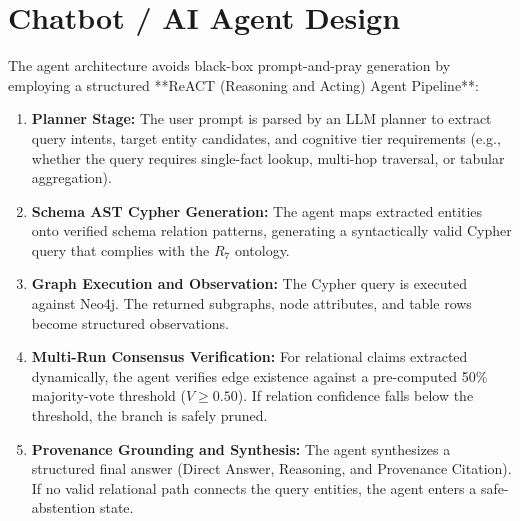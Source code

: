\section{Chatbot / AI Agent Design}
The agent architecture avoids black-box prompt-and-pray generation by employing a structured **ReACT (Reasoning and Acting) Agent Pipeline**:
\begin{enumerate}
    \item \textbf{Planner Stage:} The user prompt is parsed by an LLM planner to extract query intents, target entity candidates, and cognitive tier requirements (e.g., whether the query requires single-fact lookup, multi-hop traversal, or tabular aggregation).
    \item \textbf{Schema AST Cypher Generation:} The agent maps extracted entities onto verified schema relation patterns, generating a syntactically valid Cypher query that complies with the $R_7$ ontology.
    \item \textbf{Graph Execution and Observation:} The Cypher query is executed against Neo4j. The returned subgraphs, node attributes, and table rows become structured observations.
    \item \textbf{Multi-Run Consensus Verification:} For relational claims extracted dynamically, the agent verifies edge existence against a pre-computed 50\% majority-vote threshold ($V \ge 0.50$). If relation confidence falls below the threshold, the branch is safely pruned.
    \item \textbf{Provenance Grounding and Synthesis:} The agent synthesizes a structured final answer (Direct Answer, Reasoning, and Provenance Citation). If no valid relational path connects the query entities, the agent enters a safe-abstention state.
\end{enumerate}

